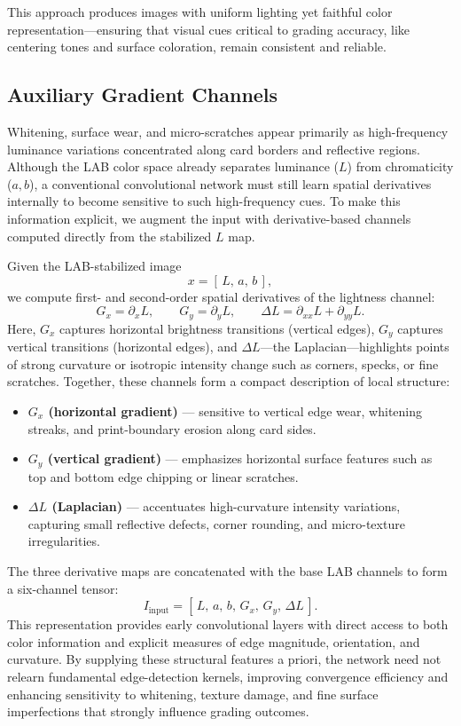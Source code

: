 \documentclass[12pt]{article}
\begin{document}
This approach produces images with uniform lighting yet faithful color representation—ensuring that visual cues critical to grading accuracy, like centering tones and surface coloration, remain consistent and reliable.

\subsection{Auxiliary Gradient Channels}
Whitening, surface wear, and micro-scratches appear primarily as high-frequency luminance variations concentrated along card borders and reflective regions. 
Although the LAB color space already separates luminance ($L$) from chromaticity ($a,b$), a conventional convolutional network must still learn spatial derivatives internally to become sensitive to such high-frequency cues. 
To make this information explicit, we augment the input with derivative-based channels computed directly from the stabilized $L$ map.

Given the LAB-stabilized image
\[
x = [\,L,\,a,\,b\,],
\]
we compute first- and second-order spatial derivatives of the lightness channel:
\[
G_x = \partial_x L, \qquad 
G_y = \partial_y L, \qquad 
\Delta L = \partial_{xx}L + \partial_{yy}L.
\]
Here, $G_x$ captures horizontal brightness transitions (vertical edges), $G_y$ captures vertical transitions (horizontal edges), and $\Delta L$---the Laplacian---highlights points of strong curvature or isotropic intensity change such as corners, specks, or fine scratches.  
Together, these channels form a compact description of local structure:
\begin{itemize}
    \item \textbf{$G_x$ (horizontal gradient)} --- sensitive to vertical edge wear, whitening streaks, and print-boundary erosion along card sides.
    \item \textbf{$G_y$ (vertical gradient)} --- emphasizes horizontal surface features such as top and bottom edge chipping or linear scratches.
    \item \textbf{$\Delta L$ (Laplacian)} --- accentuates high-curvature intensity variations, capturing small reflective defects, corner rounding, and micro-texture irregularities.
\end{itemize}

The three derivative maps are concatenated with the base LAB channels to form a six-channel tensor:
\[
I_{\text{input}} = [\,L,\,a,\,b,\,G_x,\,G_y,\,\Delta L\,].
\]
This representation provides early convolutional layers with direct access to both color information and explicit measures of edge magnitude, orientation, and curvature. 
By supplying these structural features a priori, the network need not relearn fundamental edge-detection kernels, improving convergence efficiency and enhancing sensitivity to whitening, texture damage, and fine surface imperfections that strongly influence grading outcomes.
\end{document}
